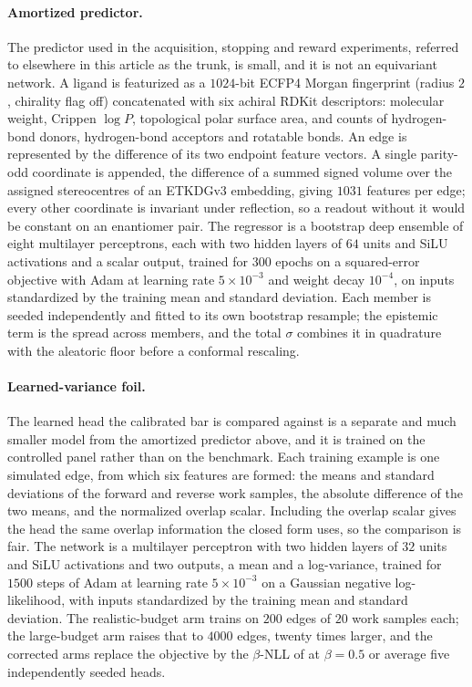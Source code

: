 \paragraph{Amortized predictor.} The predictor used in the acquisition, stopping and reward
experiments, referred to elsewhere in this article as the trunk, is small, and it is not an
equivariant network. A ligand is featurized as
a $1024$-bit ECFP4 Morgan fingerprint (radius $2$, chirality flag off) concatenated with six
achiral RDKit descriptors: molecular weight, Crippen $\log P$, topological polar surface area, and
counts of hydrogen-bond donors, hydrogen-bond acceptors and rotatable bonds. An edge is
represented by the difference of its two endpoint feature vectors. A single parity-odd coordinate is appended, the difference of a
summed signed volume over the assigned stereocentres of an ETKDGv3 embedding, giving $1031$
features per edge; every other coordinate is invariant under reflection, so a readout without it
would be constant on an enantiomer pair. The regressor is a bootstrap deep ensemble of eight multilayer perceptrons, each with
two hidden layers of $64$ units and SiLU activations and a scalar output, trained for $300$ epochs
on a squared-error objective with Adam at learning rate $5\times10^{-3}$ and weight decay
$10^{-4}$, on inputs standardized by the training mean and standard deviation. Each member is
seeded independently and fitted to its own bootstrap resample; the epistemic term is the spread
across members, and the total $\sigma$ combines it in quadrature with the aleatoric floor before a
conformal rescaling.

\paragraph{Learned-variance foil.} The learned head the calibrated bar is compared against is a
separate and much smaller model from the amortized predictor above, and it is trained on the
controlled panel rather than on the benchmark. Each training example is one simulated edge, from
which six features are formed: the means and standard deviations of the forward and reverse work
samples, the absolute difference of the two means, and the normalized overlap scalar. Including the overlap scalar gives the head the same overlap information the closed form uses, so
the comparison is fair. The network is a multilayer perceptron with two hidden layers of $32$ units and SiLU
activations and two outputs, a mean and a log-variance, trained for $1500$ steps of Adam at
learning rate $5\times10^{-3}$ on a Gaussian negative log-likelihood, with inputs standardized by
the training mean and standard deviation. The realistic-budget arm trains on $200$ edges of $20$
work samples each; the large-budget arm raises that to $4000$ edges, twenty times larger, and the
corrected arms replace the
objective by the $\beta$-NLL of \citet{seitzer2022pitfalls} at $\beta=0.5$ or average five
independently seeded heads.

